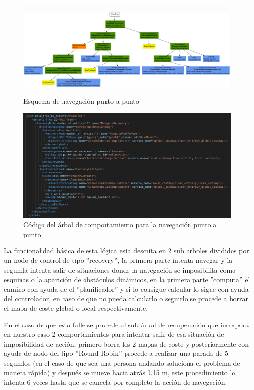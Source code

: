 \begin{figure}[htbp]
  \centering
  \begin{minipage}[b]{0.45\textwidth}
    \centering
    \includegraphics[width=\textwidth]{images/bt_ToPose_wrec_rep.png}
    \caption{Esquema de navegación punto a punto}
    \label{fig:bt_ToPose}
  \end{minipage}
  \hfill
  \begin{minipage}[b]{0.45\textwidth}
    \centering
    \includegraphics[width=\textwidth]{images/bt_ToPose_script.png}
    \caption{Código del árbol de comportamiento para la navegación punto a punto}
    \label{fig:bt_ToPose_script}
  \end{minipage}
\end{figure}

La funcionalidad básica de esta lógica esta descrita en 2 sub arboles divididos por un nodo de control de tipo ''recovery'', la primera parte intenta navegar 
y la segunda intenta salir de situaciones donde la navegación se imposibilita como esquinas o la aparición de obstáculos dinámicos, en la primera parte 
''computa'' el camino con ayuda de el ''planificador'' y si lo consigue calcular lo sigue con ayuda del controlador, en caso de que no pueda calcularlo o seguirlo 
se procede a borrar el mapa de coste global o local respectivamente.

En el caso de que esto falle se procede al sub árbol de recuperación que incorpora en nuestro caso 2 comportamientos para intentar salir de esa situación de imposibilidad de acción, 
primero borra los 2 mapas de coste y posteriormente con ayuda de nodo del tipo ''Round Robin'' procede a realizar una parada de 5 segundos (en el caso de que sea una persona andando soluciona el problema de manera rápida) y 
después se mueve hacia atrás 0.15 m, este procedimiento lo intenta 6 veces hasta que se cancela por completo la acción de navegación.

